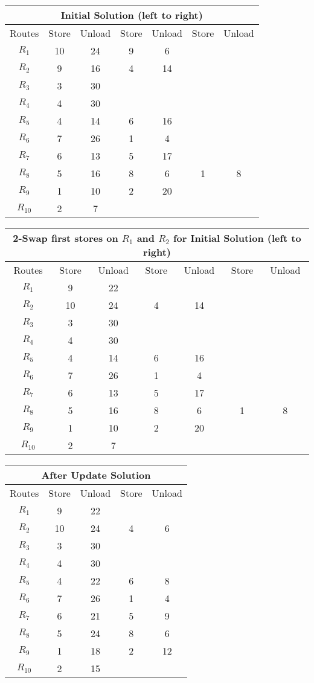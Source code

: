 \documentclass[11pt,paper=a4,parskip=half+]{article}
\begin{document}
\begin{tabular}{ | c || c | c | c | c | c | c |}
\hline
\multicolumn{7}{|c|}{Initial Solution (left to right)} \\
\hline
Routes & Store & Unload & Store & Unload & Store & Unload\\
\hline
$R_1$ & 10 & 24 & 9 & 6 & & \\
$R_2$ &  9 & 16 & 4 & 14 & & \\
$R_3$ & 3 & 30 & & & & \\
$R_4$ & 4 & 30 & & & & \\
$R_5$ & 4 & 14 & 6 & 16 & & \\
$R_6$ & 7 & 26 & 1 & 4 & & \\
$R_7$ & 6 & 13 & 5 & 17 & &\\
$R_8$ & 5 & 16 & 8 & 6 & 1 & 8 \\
$R_9$ & 1 & 10 & 2 & 20 & & \\
$R_{10}$& 2 & 7 & & & & \\
\hline
\end{tabular}

\begin{tabular}{ | c || c | c | c | c | c | c |}
\hline
\multicolumn{7}{|c|}{2-Swap first stores on $R_1$ and $R_2$ for Initial Solution (left to right)} \\
\hline
Routes & Store & Unload & Store & Unload & Store & Unload\\
\hline
$R_1$ & 9 & 22 &  &  & & \\
$R_2$ & 10 & 24 & 4 & 14 & & \\
$R_3$ & 3 & 30 & & & & \\
$R_4$ & 4 & 30 & & & & \\
$R_5$ & 4 & 14 & 6 & 16 & & \\
$R_6$ & 7 & 26 & 1 & 4 & & \\
$R_7$ & 6 & 13 & 5 & 17 & &\\
$R_8$ & 5 & 16 & 8 & 6 & 1 & 8 \\
$R_9$ & 1 & 10 & 2 & 20 & & \\
$R_{10}$& 2 & 7 & & & & \\
\hline
\end{tabular}

\begin{tabular}{ | c || c | c | c | c |}
\hline
\multicolumn{5}{|c|}{After Update Solution} \\
\hline
Routes & Store & Unload & Store & Unload \\
\hline
$R_1$ & 9 & 22 &  &   \\
$R_2$ & 10 & 24 & 4 & 6  \\
$R_3$ & 3 & 30 & &  \\
$R_4$ & 4 & 30 & &  \\
$R_5$ & 4 & 22 & 6 & 8  \\
$R_6$ & 7 & 26 & 1 & 4  \\
$R_7$ & 6 & 21 & 5 & 9 \\
$R_8$ & 5 & 24 & 8 & 6   \\
$R_9$ & 1 & 18 & 2 & 12  \\
$R_{10}$& 2 & 15 & &  \\
\hline
\end{tabular}
\end{document}
